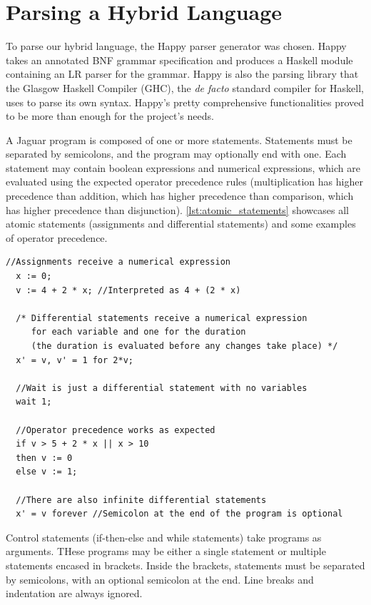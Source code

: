 \section{Parsing a Hybrid Language}
\label{sec:parser}

To parse our hybrid language, the Happy \cite{happy} parser generator was chosen. Happy takes an annotated BNF grammar specification and produces a Haskell module containing an LR parser for the grammar. Happy is also the parsing library that the Glasgow Haskell Compiler (GHC), the \textit{de facto} standard compiler for Haskell, uses to parse its own syntax. Happy's pretty comprehensive functionalities proved to be more than enough for the project's needs.

A Jaguar program is composed of one or more statements. Statements must be separated by semicolons, and the program may optionally end with one. Each statement may contain boolean expressions and numerical expressions, which are evaluated using the expected operator precedence rules (multiplication has higher precedence than addition, which has higher precedence than comparison, which has higher precedence than disjunction). \cref{lst:atomic_statements} showcases all atomic statements (assignments and differential statements) and some examples of operator precedence.

\begin{lstlisting}[caption=Jaguar program with no particular meaning showcasing atomic statements and operator precedence,label=lst:atomic_statements]
  //Assignments receive a numerical expression
  x := 0;
  v := 4 + 2 * x; //Interpreted as 4 + (2 * x)

  /* Differential statements receive a numerical expression
     for each variable and one for the duration
     (the duration is evaluated before any changes take place) */
  x' = v, v' = 1 for 2*v;

  //Wait is just a differential statement with no variables
  wait 1;

  //Operator precedence works as expected
  if v > 5 + 2 * x || x > 10
  then v := 0
  else v := 1;

  //There are also infinite differential statements
  x' = v forever //Semicolon at the end of the program is optional
\end{lstlisting}

Control statements (if-then-else and while statements) take programs as arguments. THese programs may be either a single statement or multiple statements encased in brackets. Inside the brackets, statements must be separated by semicolons, with an optional semicolon at the end. Line breaks and indentation are always ignored.

